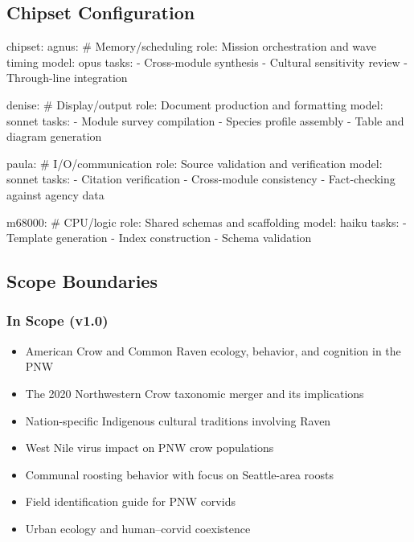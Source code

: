 \documentclass[11pt,letterpaper]{article}
\begin{document}
\subsection{Chipset Configuration}

\begin{asciibox}
chipset:
  agnus:                    # Memory/scheduling
    role: Mission orchestration and wave timing
    model: opus
    tasks:
      - Cross-module synthesis
      - Cultural sensitivity review
      - Through-line integration

  denise:                   # Display/output
    role: Document production and formatting
    model: sonnet
    tasks:
      - Module survey compilation
      - Species profile assembly
      - Table and diagram generation

  paula:                    # I/O/communication
    role: Source validation and verification
    model: sonnet
    tasks:
      - Citation verification
      - Cross-module consistency
      - Fact-checking against agency data

  m68000:                   # CPU/logic
    role: Shared schemas and scaffolding
    model: haiku
    tasks:
      - Template generation
      - Index construction
      - Schema validation
\end{asciibox}

\subsection{Scope Boundaries}

\subsubsection{In Scope (v1.0)}
\begin{itemize}[leftmargin=2em]
  \item American Crow and Common Raven ecology, behavior, and cognition in the PNW
  \item The 2020 Northwestern Crow taxonomic merger and its implications
  \item Nation-specific Indigenous cultural traditions involving Raven
  \item West Nile virus impact on PNW crow populations
  \item Communal roosting behavior with focus on Seattle-area roosts
  \item Field identification guide for PNW corvids
  \item Urban ecology and human--corvid coexistence
\end{itemize}
\end{document}
